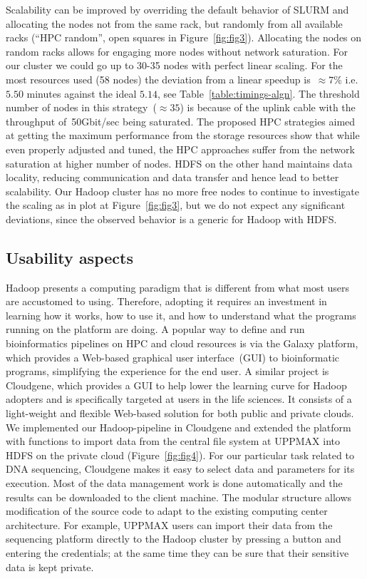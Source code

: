\documentclass[10pt]{article}
\begin{document}
Scalability can be improved by overriding the default behavior of SLURM and allocating the nodes not from the same rack, but randomly from all available racks (``HPC random'', open squares in Figure~\ref{fig:fig3}). Allocating the nodes on random racks allows for engaging more nodes without network saturation. For our cluster we could go up to 30-35 nodes with perfect linear scaling. For the most resources used (58 nodes) the deviation from a linear speedup is~$\approx 7\%$ i.e. $5.50$ minutes against the ideal $5.14$, see Table~\ref{table:timings-algn}. The threshold number of nodes in this strategy~($\approx35$) is because of the uplink cable with the throughput of~50Gbit/sec being saturated. 
The proposed HPC strategies aimed at getting the maximum performance from the storage resources show that while even properly adjusted and tuned, the HPC approaches suffer from the network saturation at higher number of nodes.
HDFS on the other hand maintains data locality, reducing communication and data transfer and hence lead to better scalability.
Our Hadoop cluster has no more free nodes to continue to investigate the scaling as in plot at Figure~\ref{fig:fig3}, but we do not expect any significant deviations, since the observed behavior is a generic for Hadoop with HDFS\cite{lin2010, Hadoop:Guide}. 


\subsection*{Usability aspects}
\label{subsectionIV_2}

Hadoop presents a computing paradigm that is different from what most users are
accustomed to using.  Therefore, adopting it requires an investment in learning
how it works, how to use it, and how to understand what the programs running on
the platform are doing.
A popular way to define and run bioinformatics pipelines on HPC and cloud resources
is via the Galaxy\cite{galaxy,Afgan:2010uq} platform, which provides a Web-based graphical
user interface~(GUI) to bioinformatic programs, simplifying the experience for
the end user.
A similar project is Cloudgene\cite{cloudgene}, which provides a GUI to help lower the learning curve
for Hadoop adopters and is specifically targeted at users in the life
sciences. It consists of a light-weight and flexible Web-based solution for both
public and private clouds. We implemented our Hadoop-pipeline in Cloudgene and
extended the platform with functions to import data from the central file system
at UPPMAX into HDFS on the private cloud (Figure~\ref{fig:fig4}).  For our
particular task related to DNA sequencing, Cloudgene makes it easy to select
data and parameters for its execution. Most of the data management work is done
automatically and the results can be downloaded to the client machine. The
modular structure allows modification of the source code to adapt to the
existing computing center architecture. For example, UPPMAX users can import
their data from the sequencing platform directly to the Hadoop cluster by
pressing a button and entering the credentials; at the same time they can be
sure that their sensitive data is kept private.
\end{document}

